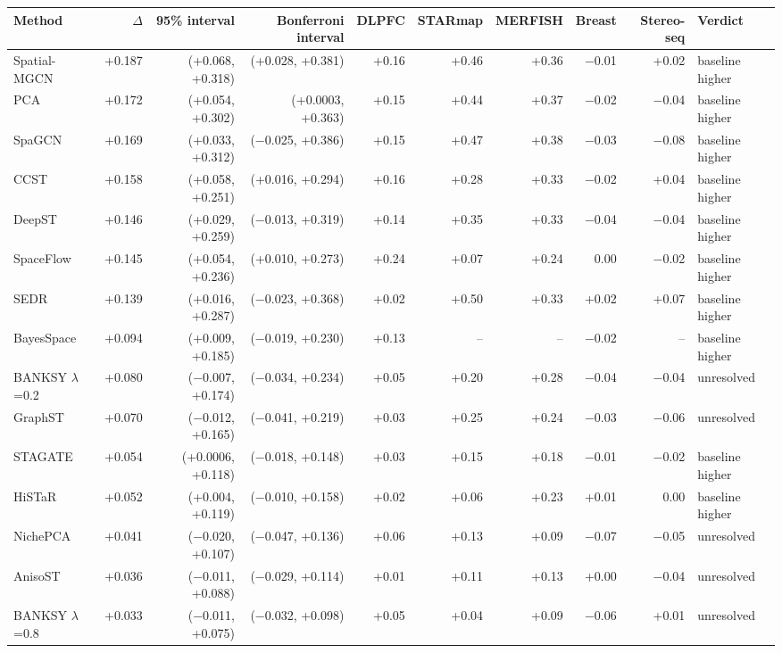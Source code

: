 \scriptsize
\begin{tabular}{lrrrrrrrrl}
\toprule
Method & $\Delta$ & 95\% interval & Bonferroni interval & DLPFC & STARmap & MERFISH & Breast & Stereo-seq & Verdict \\
\midrule
Spatial-MGCN & +0.187 & (+0.068, +0.318) & (+0.028, +0.381) & +0.16 & +0.46 & +0.36 & $-$0.01 & +0.02 & baseline higher \\
PCA & +0.172 & (+0.054, +0.302) & (+0.0003, +0.363) & +0.15 & +0.44 & +0.37 & $-$0.02 & $-$0.04 & baseline higher \\
SpaGCN & +0.169 & (+0.033, +0.312) & ($-$0.025, +0.386) & +0.15 & +0.47 & +0.38 & $-$0.03 & $-$0.08 & baseline higher \\
CCST & +0.158 & (+0.058, +0.251) & (+0.016, +0.294) & +0.16 & +0.28 & +0.33 & $-$0.02 & +0.04 & baseline higher \\
DeepST & +0.146 & (+0.029, +0.259) & ($-$0.013, +0.319) & +0.14 & +0.35 & +0.33 & $-$0.04 & $-$0.04 & baseline higher \\
SpaceFlow & +0.145 & (+0.054, +0.236) & (+0.010, +0.273) & +0.24 & +0.07 & +0.24 & 0.00 & $-$0.02 & baseline higher \\
SEDR & +0.139 & (+0.016, +0.287) & ($-$0.023, +0.368) & +0.02 & +0.50 & +0.33 & +0.02 & +0.07 & baseline higher \\
BayesSpace & +0.094 & (+0.009, +0.185) & ($-$0.019, +0.230) & +0.13 & -- & -- & $-$0.02 & -- & baseline higher \\
BANKSY $\lambda$=0.2 & +0.080 & ($-$0.007, +0.174) & ($-$0.034, +0.234) & +0.05 & +0.20 & +0.28 & $-$0.04 & $-$0.04 & unresolved \\
GraphST & +0.070 & ($-$0.012, +0.165) & ($-$0.041, +0.219) & +0.03 & +0.25 & +0.24 & $-$0.03 & $-$0.06 & unresolved \\
STAGATE & +0.054 & (+0.0006, +0.118) & ($-$0.018, +0.148) & +0.03 & +0.15 & +0.18 & $-$0.01 & $-$0.02 & baseline higher \\
HiSTaR & +0.052 & (+0.004, +0.119) & ($-$0.010, +0.158) & +0.02 & +0.06 & +0.23 & +0.01 & 0.00 & baseline higher \\
NichePCA & +0.041 & ($-$0.020, +0.107) & ($-$0.047, +0.136) & +0.06 & +0.13 & +0.09 & $-$0.07 & $-$0.05 & unresolved \\
AnisoST & +0.036 & ($-$0.011, +0.088) & ($-$0.029, +0.114) & +0.01 & +0.11 & +0.13 & +0.00 & $-$0.04 & unresolved \\
BANKSY $\lambda$=0.8 & +0.033 & ($-$0.011, +0.075) & ($-$0.032, +0.098) & +0.05 & +0.04 & +0.09 & $-$0.06 & +0.01 & unresolved \\

\end{tabular}
